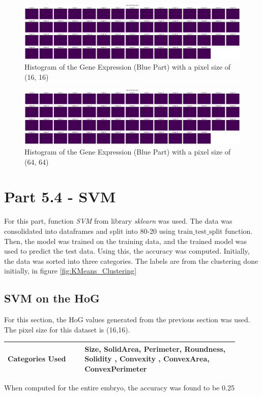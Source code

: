 \documentclass{article}
\begin{document}
\begin{landscape}
    \begin{figure}
    \centering
    \includegraphics[width=1\linewidth, keepaspectratio]{Report/Images/Appendix Images/HoG/HoG_blue_16,16.png}
    \caption{Histogram of the Gene Expression (Blue Part) with a pixel size of (16, 16)}
    \label{fig:hog_blue_1616}
\end{figure}
\end{landscape}
\clearpage

\begin{landscape}
    \begin{figure}
    \centering
    \includegraphics[width=1\linewidth, keepaspectratio]{Report/Images/Appendix Images/HoG/HoG_blue_64,64.png}
    \caption{Histogram of the Gene Expression (Blue Part) with a pixel size of (64, 64)}
    \label{fig:hog_blue_6464}
\end{figure}
\end{landscape}
\clearpage
\section*{Part 5.4 - SVM}
For this part, function \textit{SVM} from library \textit{sklearn} was used. The data was consolidated into dataframes and split into 80-20 using $\text{train\_test\_split}$ function. \\Then, the model was trained on the training data, and the trained model was used to predict the test data. Using this, the accuracy was computed. 
Initially, the data was sorted into three categories. The labels are from the clustering done initially, in figure  \ref{fig:KMeans_Clustering}
\subsection*{SVM on the HoG}
For this section, the HoG values generated from the previous section was used. The pixel size for this dataset is (16,16).
\begin{table}[h!]
    \centering
    \begin{tabular}{|p{0.3\linewidth} | p{0.6\linewidth}|}
    \hline
       Categories Used &  Size, SolidArea, Perimeter, Roundness, Solidity , Convexity , ConvexArea, ConvexPerimeter \\
    \hline
    \end{tabular}
    \label{tab:SVM_HoG}
\end{table}
When computed for the entire embryo, the accuracy was found to be 0.25
\end{document}
